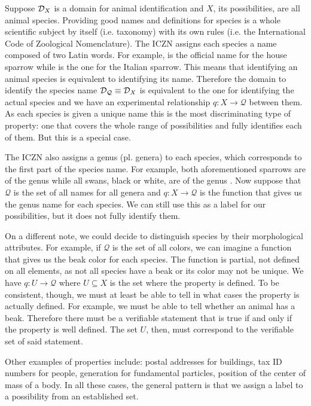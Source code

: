\documentclass[11pt,letterpaper,fleqn]{memoir} %
\begin{document}
Suppose $\mathcal{D}_X$ is a domain for animal identification and $X$, its possibilities, are all animal species. Providing good names and definitions for species is a whole scientific subject by itself (i.e. taxonomy) with its own rules (i.e. the International Code of Zoological Nomenclature). The ICZN assigns each species a name composed of two Latin words. For example,  is the official name for the house sparrow while  is the one for the Italian sparrow. This means that identifying an animal species is equivalent to identifying its name. Therefore the domain to identify the species name $\mathcal{D}_{\mathcal{Q}} \equiv \mathcal{D}_X$ is equivalent to the one for identifying the actual species and we have an experimental relationship $q: X \to \mathcal{Q}$ between them. As each species is given a unique name this is the most discriminating type of property: one that covers the whole range of possibilities and fully identifies each of them. But this is a special case.

The ICZN also assigns a genus (pl. genera) to each species, which corresponds to the first part of the species name. For example, both aforementioned sparrows are of the genus  while all swans, black or white, are of the genus . Now suppose that $\mathcal{Q}$ is the set of all names for all genera and $q: X \to \mathcal{Q}$ is the function that gives us the genus name for each species. We can still use this as a label for our possibilities, but it does not fully identify them.

On a different note, we could decide to distinguish species by their morphological attributes. For example, if $\mathcal{Q}$ is the set of all colors, we can imagine a function that gives us the beak color for each species. The function is partial, not defined on all elements, as not all species have a beak or its color may not be unique. We have $q: U \to \mathcal{Q}$ where $U \subseteq X$ is the set where the property is defined. To be consistent, though, we must at least be able to tell in what cases the property is actually defined. For example, we must be able to tell whether an animal has a beak. Therefore there must be a verifiable statement that is true if and only if the property is well defined. The set $U$, then, must correspond to the verifiable set of said statement.

Other examples of properties include: postal addresses for buildings, tax ID numbers for people, generation for fundamental particles, position of the center of mass of a body. In all these cases, the general pattern is that we assign a label to a possibility from an established set.
\end{document}
